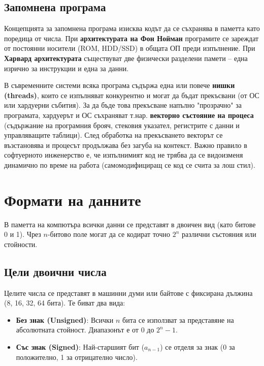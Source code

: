 \documentclass{scrartcl}
\begin{document}
\begin{FlushLeft}
\subsection{Запомнена програма} 
Концепцията за запомнена програма изисква кодът да се съхранява в паметта като поредица от числа. При \textbf{архитектурата на Фон Нойман} програмите се зареждат от постоянни носители (ROM, HDD/SSD) в общата ОП преди изпълнение. При \textbf{Харвард архитектурата} съществуват две физически разделени памети – една изрично за инструкции и една за данни.

В съвременните системи всяка програма съдържа една или повече \textbf{нишки (threads)}, които се изпълняват конкурентно и могат да бъдат прекъсвани (от ОС или хардуерни събития). За да бъде това прекъсване напълно "прозрачно" за програмата, хардуерът и ОС съхраняват т.нар. \textbf{векторно състояние на процеса} (съдържание на програмния брояч, стековия указател, регистрите с данни и управляващите таблици). След обработка на прекъсването векторът се възстановява и процесът продължава без загуба на контекст. Важно правило в софтуерното инженерство е, че изпълнимият код не трябва да се видоизменя динамично по време на работа (самомодифициращ се код се счита за лош стил).

\section{Формати на данните} 

В паметта на компютъра всички данни се представят в двоичен вид (като битове 0 и 1). Чрез $n$-битово поле могат да се кодират точно $2^n$ различни състояния или стойности.

\subsection{Цели двоични числа} 
Целите числа се представят в машинни думи или байтове с фиксирана дължина (8, 16, 32, 64 бита). Те биват два вида:
\begin{itemize}
    \item \textbf{Без знак (Unsigned)}: Всички $n$ бита се използват за представяне на абсолютната стойност. Диапазонът е от $0$ до $2^n - 1$.
    \item \textbf{Със знак (Signed)}: Най-старшият бит ($a_{n-1}$) се отделя за знак (0 за положително, 1 за отрицателно число).
\end{itemize}


\end{FlushLeft}
\end{document}
